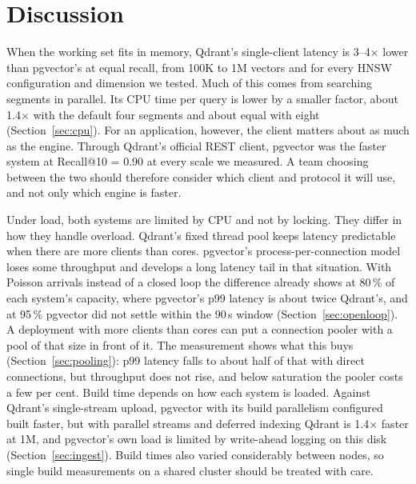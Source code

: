 \documentclass[sigconf, nonacm]{acmart}
\begin{document}
\section{Discussion}

When the working set fits in memory, Qdrant's single-client latency is 3--4$\times$ lower
than pgvector's at equal recall, from 100K to 1M vectors and for every HNSW configuration
and dimension we tested. Much of this comes from searching segments in parallel. Its CPU
time per query is lower by a smaller factor, about 1.4$\times$ with the default four
segments and about equal with eight (Section~\ref{sec:cpu}). For an
application, however, the client matters about as much as the engine. Through Qdrant's
official REST client, pgvector was the faster system at Recall@10 = 0.90 at every scale we
measured. A team choosing between the two should therefore consider which client and
protocol it will use, and not only which engine is faster.

Under load, both systems are limited by CPU and not by locking. They differ in how they
handle overload. Qdrant's fixed thread pool keeps latency predictable when there are more
clients than cores. pgvector's process-per-connection model loses some throughput and
develops a long latency tail in that situation. With Poisson arrivals instead of a closed loop the difference
already shows at 80\,\% of each system's capacity, where pgvector's p99 latency is about twice Qdrant's, and at 95\,\% pgvector did not
settle within the 90\,s window (Section~\ref{sec:openloop}). A deployment with more clients than cores
can put a connection pooler with a pool of that size in front of it. The measurement shows what this buys
(Section~\ref{sec:pooling}): p99 latency falls to about half of that with direct connections, but throughput
does not rise, and below saturation the pooler costs a few per cent. Build time depends on how each system is
loaded. Against Qdrant's single-stream upload, pgvector with its build parallelism
configured built faster, but with parallel streams and deferred indexing Qdrant is
1.4$\times$ faster at 1M, and pgvector's own load is limited by write-ahead logging on this
disk (Section~\ref{sec:ingest}). Build times also varied considerably between nodes, so
single build measurements on a shared cluster should be treated with care.
\end{document}
